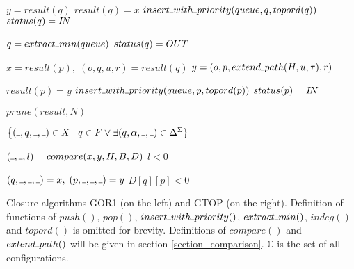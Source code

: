 \documentclass[AMA,STIX1COL]{WileyNJD-v2}
\newcommand{\Xund}{\rule{.4em}{.4pt}}
\newcommand{\YC}{\mathbb{C}}
\begin{document}
\begin{algorithm}[]
\begin{multicols}{2}
{        \BlankLine
        \For {$x = (\Xund, q, \Xund, \Xund) \in X$} {
            $y = result(q)$ \;
             {
                $result(q) = x$ \;
                 {
                    $insert \Xund with \Xund priority(queue, q, topord(q))$ \;
                    $status(q) = I\!N$ \;
                }
            }
        }

        \BlankLine
         {

            $q = extract \Xund min(queue)$ \;
            $status(q) = OUT$ \;

            \BlankLine
             {
                $x = result(p), \; (o, q, u, r) = result(q)$ \;
                $y = (o, p, extend \Xund path (H, u, \tau), r)$ \;

                \BlankLine
                 {
                    $result(p) = y$ \;
                     {
                        $insert \Xund with \Xund priority(queue, p, topord(p))$ \;
                        $status(p) = I\!N$ \;
                    }
                }
            }
        }

        \BlankLine
        \Return $prune(result, N)$
    }
    \BlankLine
    \BlankLine

     {
        \Return $\big\{ (\Xund, q, \Xund, \Xund) \in X \mid
            q \in F \vee \exists (q, \alpha, \Xund, \Xund) \in \Delta^\Sigma \}$
    }
    \BlankLine
    \BlankLine

     {
        $(\Xund, \Xund, l) = compare (x, y, H, B, D)$ \;
        \Return $l < 0$
    }
    \BlankLine
    \BlankLine

     {
        $(q, \Xund, \Xund, \Xund) = x, \; (p, \Xund, \Xund, \Xund) = y$ \;
        \Return $D[q][p] < 0$
    }
    \BlankLine
    \BlankLine

\end{multicols}
\vspace{1em}
\caption{
Closure algorithms GOR1 (on the left) and GTOP (on the right).
Definition of functions of $push()$, $pop()$, $insert \Xund with \Xund priority()$, $extract \Xund min()$,
$indeg()$ and $topord()$ is omitted for brevity.
Definitions of $compare ()$ and $extend \Xund path ()$ will be given in section \ref{section_comparison}.
$\YC$ is the set of all configurations.}
\end{algorithm}
\end{document}
